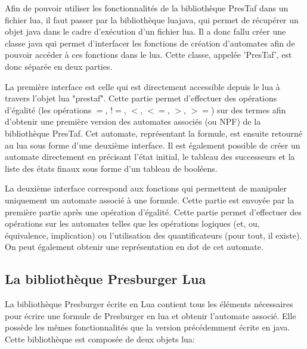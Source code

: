 Afin de pouvoir utiliser les fonctionnalités de la bibliothèque PresTaf dans un fichier lua, il faut passer par la bibliothèque luajava, qui permet de récupérer un objet java dans le cadre d'exécution d’un fichier lua. Il a donc fallu créer une classe java qui permet d’interfacer les fonctions de création d’automates afin de pouvoir accéder à ces fonctions dans le lua. \clearpage Cette classe, appelée 'PresTaf', est donc séparée en deux parties.\\\par 

La première interface est celle qui est directement accessible depuis le lua à travers l’objet lua "prestaf". Cette partie permet d’effectuer des opérations d’égalité (les opérations $=$, $!=$, $<$, $<=$, $>$, $>=$) sur des termes afin d’obtenir une première version des automates associés (ou NPF) de la bibliothèque PresTaf. Cet automate, représentant la formule, est ensuite retourné au lua sous forme d’une deuxième interface. Il est également possible de créer un automate directement en précisant l’état initial, le tableau des successeurs et la liste des états finaux sous forme d’un tableau de booléens.\\\par

La deuxième interface correspond aux fonctions qui permettent de manipuler uniquement un automate associé à une formule. Cette partie est envoyée par la première partie après une opération d’égalité. Cette partie permet d’effectuer des opérations sur les automates telles que les opérations logiques (et, ou, équivalence, implication) ou l’utilisation des quantificateurs (pour tout, il existe). On peut également obtenir une représentation en dot de cet automate.

\subsection{La bibliothèque Presburger Lua}

La bibliothèque Presburger écrite en Lua contient tous les éléments nécessaires pour écrire une formule de Presburger en lua et obtenir l’automate associé. Elle possède les mêmes fonctionnalités que la version précédemment écrite en java. Cette bibliothèque est composée de deux objets lua:

